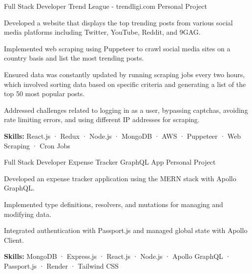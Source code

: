 

\begin{cventries}


  \cventry
  {Full Stack Developer} %
  {Trend League - trendligi.com} %
  {Personal Project} %
  {}
  {
    \begin{cvitems} %
      \item {Developed a website that displays the top trending posts from various social media platforms including Twitter, YouTube, Reddit, and 9GAG.}
      \item {Implemented web scraping using Puppeteer to crawl social media sites on a country basis and list the most trending posts.}
      \item {Ensured data was constantly updated by running scraping jobs every two hours, which involved sorting data based on specific criteria and generating a list of the top 50 most popular posts.}
      \item {Addressed challenges related to logging in as a user, bypassing captchas, avoiding rate limiting errors, and using different IP addresses for scraping.}
      \item {\textbf {Skills:} React.js · Redux · Node.js · MongoDB · AWS · Puppeteer · Web Scraping · Cron Jobs}
    \end{cvitems}
  }

  \cventry
    {Full Stack Developer} %
    {Expense Tracker GraphQL App} %
    {Personal Project} %
    {}
    {
      \begin{cvitems} %
        \item {Developed an expense tracker application using the MERN stack with Apollo GraphQL.}
        \item {Implemented type definitions, resolvers, and mutations for managing and modifying data.}
        \item {Integrated authentication with Passport.js and managed global state with Apollo Client.}
        \item {\textbf {Skills:} MongoDB · Express.js · React.js · Node.js · Apollo GraphQL · Passport.js · Render · Tailwind CSS}
      \end{cvitems}
    }


\end{cventries}
